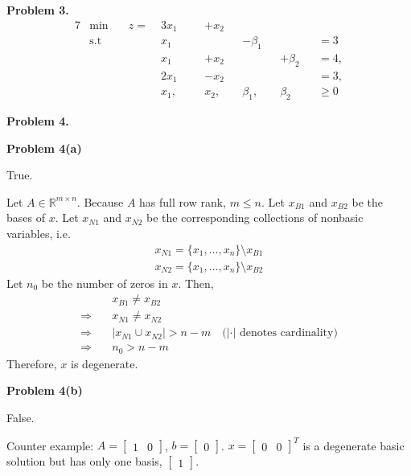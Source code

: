 \documentclass[12pt]{article}
\begin{document}
\vspace{\baselineskip}
\noindent
\textbf{Problem 3.}
\begin{alignat*}{7}
    &\text{min}\quad      & z = \;& 3x_1 &&& + x_2 & \\
    &\text{s.t}  & & x_1 &&& && - \beta_1 && && = 3 \\
    & & & x_1  &&& +x_2 &&  && +\beta_2 &&= 4, \\
    & & & 2x_1  &&& - x_2 && && &&= 3, \\
    & & & x_1, &&& x_2, &&\beta_1, &&\beta_2  &&\ge 0
\end{alignat*}

\vspace{\baselineskip}
\noindent
\textbf{Problem 4.}

\noindent
\textbf{Problem 4(a)} 

True.

Let $A \in \mathbb{R}^{m\times n}$. Because $A$ has full row rank, $m \le n$. Let $x_{B1}$ and $x_{B2}$ be the bases of $x$. Let $x_{N1}$ and $x_{N2}$ be the corresponding collections of nonbasic variables, i.e.
\begin{gather*}
    x_{N1} = \{x_1, \hdots, x_n\} \setminus x_{B1} \\
    x_{N2} = \{x_1, \hdots, x_n\} \setminus x_{B2}
\end{gather*}
Let $n_0$ be the number of zeros in $x$. Then,
\begin{align*}
    & x_{B1} \ne x_{B2} \\
    \Rightarrow \quad & x_{N1} \ne x_{N2} \\
    \Rightarrow \quad & \left| x_{N1} \cup x_{N2} \right| > n-m \quad \text{($\left|\cdot\right|$ denotes cardinality)}\\
    \Rightarrow \quad & n_0 > n-m
\end{align*}
Therefore, $x$ is degenerate.

\vspace{\baselineskip}
\noindent
\textbf{Problem 4(b)} 

False.

Counter example:
$A=\begin{bmatrix} 1 & 0 \end{bmatrix}$, $b=\begin{bmatrix} 0 \end{bmatrix}$. $x=\begin{bmatrix} 0 & 0 \end{bmatrix}^T$ is a degenerate basic solution but has only one basis, $\begin{bmatrix} 1 \end{bmatrix}$.
\end{document}
